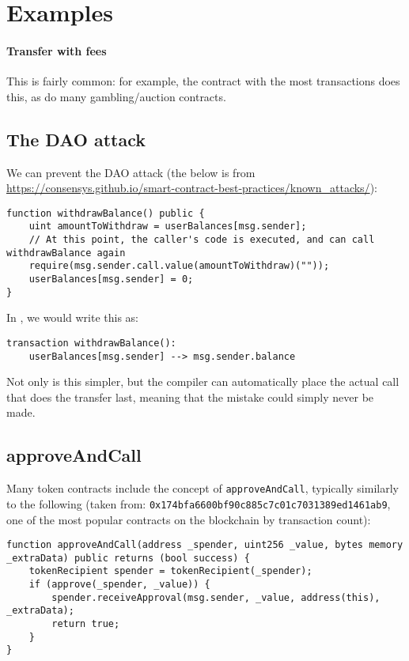 \documentclass[10pt]{article}
\begin{document}
\section{Examples}
\paragraph{Transfer with fees}
This is fairly common: for example, the contract with the most transactions does this, as do many gambling/auction contracts.

\subsection{The DAO attack}
We can prevent the DAO attack (the below is from \url{https://consensys.github.io/smart-contract-best-practices/known_attacks/}):
\begin{lstlisting}
function withdrawBalance() public {
    uint amountToWithdraw = userBalances[msg.sender];
    // At this point, the caller's code is executed, and can call withdrawBalance again
    require(msg.sender.call.value(amountToWithdraw)(""));
    userBalances[msg.sender] = 0;
}
\end{lstlisting}

In \langName, we would write this as:

\begin{lstlisting}
transaction withdrawBalance():
    userBalances[msg.sender] --> msg.sender.balance
\end{lstlisting}

Not only is this simpler, but the compiler can automatically place the actual call that does the transfer last, meaning that the mistake could simply never be made.

\subsection{approveAndCall}

Many token contracts include the concept of \lstinline{approveAndCall}, typically similarly to the following (taken from: \lstinline{0x174bfa6600bf90c885c7c01c7031389ed1461ab9}, one of the most popular contracts on the blockchain by transaction count):
\begin{lstlisting}
function approveAndCall(address _spender, uint256 _value, bytes memory _extraData) public returns (bool success) {
    tokenRecipient spender = tokenRecipient(_spender);
    if (approve(_spender, _value)) {
        spender.receiveApproval(msg.sender, _value, address(this), _extraData);
        return true;
    }
}
\end{lstlisting}
\end{document}
